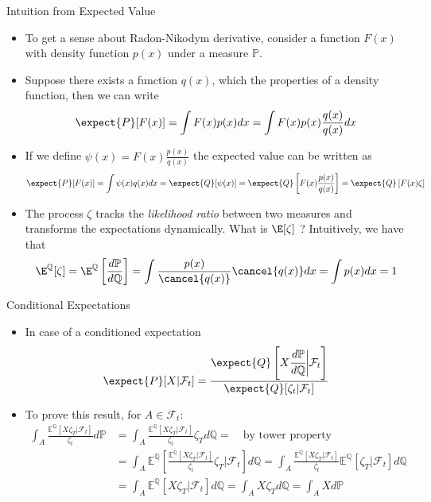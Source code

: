 \documentclass{beamer}
\begin{document}
	\begin{frame}{Intuition from Expected Value}
		\begin{itemize}
			\item To get a sense about Radon-Nikodym derivative, consider a function $F(x)$ with density function $p(x)$ under a measure $\mathbb{P}$.
			\item Suppose there exists a function $q(x)$, which the properties of a density function, then we can write
			\begin{equation*}
				\expect{P}[F(x)]=\int F(x)p(x)dx = \int F(x)p(x)\frac{q(x)}{q(x)}dx
			\end{equation*}
			\item If we define $\psi(x)=F(x)\frac{p(x)}{q(x)}$ the expected value can be written as
			\begin{equation*}
				\expect{P}[F(x)] =\int\psi(x)q(x)dx=\expect{Q}[\psi(x)]=\expect{Q}\left[F(x)\frac{p(x)}{q(x)}\right]
				=\expect{Q}\left[F(x)\zeta\right]
			\end{equation*}
			\item The process $\zeta$ tracks the \emph{likelihood ratio} between two measures and transforms the expectations dynamically. What is $\E[\zeta]$ ? Intuitively, we have that
			\begin{equation*}
				\E^\mathbb{Q}[\zeta]=\E^\mathbb{Q}\left[\frac{d\mathbb{P}}{d\mathbb{Q}}\right]=\int \frac{p(x)}{\cancel{q(x)}} \cancel{q(x)} dx =\int p(x)dx = 1
			\end{equation*}
		\end{itemize}

	\end{frame}

	\begin{frame}{Conditional Expectations}
		\begin{itemize}
			\item In case of a conditioned expectation
			\begin{equation}
				\expect{P}[X|\mathcal{F}_t] = \frac{\expect{Q}\left[X\cfrac{d\mathbb{P}}{d\mathbb{Q}}\bigg|\mathcal{F}_t\right]}{\expect{Q}[\zeta_t|\mathcal{F}_t]}
				\label{eq:conditioned_expectation}
			\end{equation}
			\item To prove this result, for $A \in \mathcal{F}_t$:
		\begin{align*}
			\int_A \frac{\mathbb{E}^\mathbb{Q}[X\zeta_T|\mathcal{F}_t]}{\zeta_t} d\mathbb{P} &= \int_A \frac{\mathbb{E}^\mathbb{Q}[X\zeta_T|\mathcal{F}_t]}{\zeta_t} \zeta_T d\mathbb{Q} = \quad \text{by tower property}  \\
			&= \int_A \mathbb{E}^\mathbb{Q} \left[ \frac{\mathbb{E}^\mathbb{Q}[X\zeta_T|\mathcal{F}_t]}{\zeta_t} \zeta_T \bigg| \mathcal{F}_t \right] d\mathbb{Q} = \int_A \frac{\mathbb{E}^\mathbb{Q}[X\zeta_T|\mathcal{F}_t]}{\zeta_t} \mathbb{E}^\mathbb{Q}[\zeta_T|\mathcal{F}_t] d\mathbb{Q} \\
			&= \int_A \mathbb{E}^\mathbb{Q}[X\zeta_T|\mathcal{F}_t] d\mathbb{Q} = \int_A X\zeta_T d\mathbb{Q} = \int_A X d\mathbb{P}
		\end{align*}
		\end{itemize}
	\end{frame}
\end{document}
